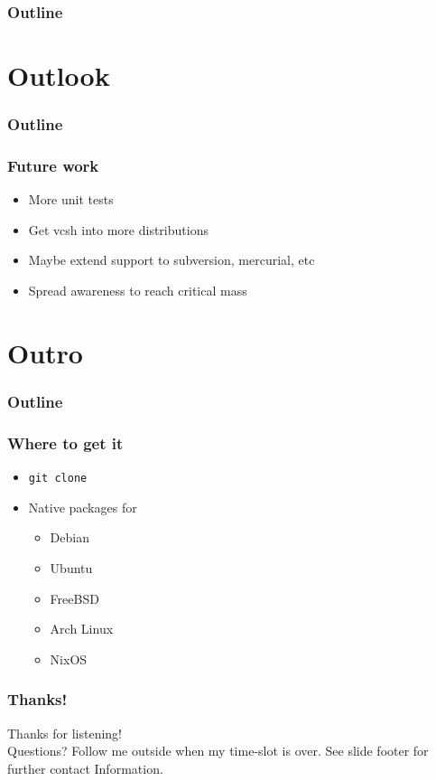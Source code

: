 \documentclass[t]{beamer}
\begin{document}
\begin{frame}
	\frametitle{Outline}
	\tableofcontents[currentsection]
\end{frame}



\section{Outlook}

\begin{frame}
	\frametitle{Outline}
	\tableofcontents[currentsection]
\end{frame}

\begin{frame}
	\frametitle{Future work}
	\begin{itemize}
		\item More unit tests
		\item Get vcsh into more distributions
		\item Maybe extend support to subversion, mercurial, etc
		\item Spread awareness to reach critical mass
	\end{itemize}
\end{frame}

\section{Outro}

\begin{frame}
	\frametitle{Outline}
	\tableofcontents[currentsection]
\end{frame}

\begin{frame}
	\frametitle{Where to get it}
	\begin{itemize}
		\item \texttt{git clone }
		\item Native packages for
		\begin{itemize}
			\item Debian
			\item Ubuntu
			\item FreeBSD
			\item Arch Linux
			\item NixOS
		\end{itemize}
	\end{itemize}
\end{frame}

\begin{frame}
	\frametitle{Thanks!}
		\begin{center}
			\vfill
			Thanks for listening!\\
			\vfill
			Questions? Follow me outside when my time-slot is over.
			\vfill
			See slide footer for further contact Information.
			\vfill
		\end{center}
\end{frame}
\end{document}
